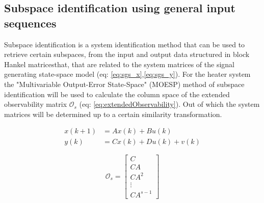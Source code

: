 \subsection{Subspace identification using general input sequences}
Subspace identification is a system identification method that can be used to retrieve certain subspaces, from the input and output data structured in block Hankel matricesthat, that are related to the system matrices of the signal generating state-space model (eq: \ref{eq:sgs_x},\ref{eq:sgs_y}). For the heater system the "Multivariable Output-Error State-Space" (MOESP) method \cite[p.~301--312]{FilteringIdentification} of subspace identification will be used to calculate the column space of the extended observability matrix $\mathcal{O}_s$ (eq: \ref{eq:extendedObservability}). Out of which the system matrices will be determined up to a certain similarity transformation. 

\begin{align}
    x(k+1) &= Ax(k) + Bu(k) \label{eq:sgs_x}\\
    y(k) &= Cx(k) + Du(k) + v(k) \label{eq:sgs_y}
\end{align}

\begin{equation}
\mathcal{O}_s = \left[\begin{array}{c}
C \\
C A \\
C A^{2} \\
\vdots \\
C A^{s-1}
\end{array}\right]
\label{eq:extendedObservability}
\end{equation}

